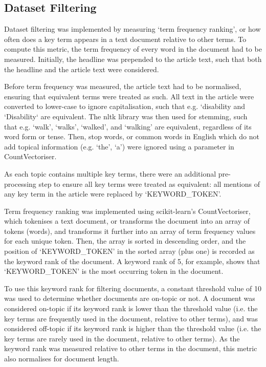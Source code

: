 \documentclass{report}
\begin{document}
\subsection{Dataset Filtering} \label{des-filtering}

Dataset filtering was implemented by measuring `term frequency ranking', or how often does a key term appears in a text document relative to other terms.
To compute this metric, the term frequency of every word in the document had to be measured.
Initially, the headline was prepended to the article text, such that both the headline and the article text were considered.

Before term frequency was measured, the article text had to be normalised, ensuring that equivalent terms were treated as such.
All text in the article were converted to lower-case to ignore capitalisation, such that e.g. `disability and `Disability` are equivalent.
The nltk library \cite{Nltk} was then used for stemming, such that e.g. `walk', `walks', `walked', and `walking' are equivalent, regardless of its word form or tense.
Then, stop words, or common words in English which do not add topical information (e.g. `the', `a') were ignored using a parameter in CountVectoriser.

As each topic contains multiple key terms, there were an additional pre-processing step to ensure all key terms were treated as equivalent: all mentions of any key term in the article were replaced by `KEYWORD\_TOKEN'.

Term frequency ranking was implemented using scikit-learn's \cite{Scikit-learn} CountVectoriser, which tokenises a text document, or transforms the document into an array of tokens (words), and transforms it further into an array of term frequency values for each unique token.
Then, the array is sorted in descending order, and the position of `KEYWORD\_TOKEN' in the sorted array (plus one) is recorded as the keyword rank of the document.
A keyword rank of 5, for example, shows that `KEYWORD\_TOKEN' is the  most occurring token in the document.

To use this keyword rank for filtering documents, a constant threshold value of 10 was used to determine whether documents are on-topic or not.
A document was considered on-topic if its keyword rank is lower than the threshold value (i.e. the key terms are frequently used in the document, relative to other terms), and was considered off-topic if its keyword rank is higher than the threshold value (i.e. the key terms are rarely used in the document, relative to other terms).
As the keyword rank was measured relative to other terms in the document, this metric also normalises for document length.
\end{document}
